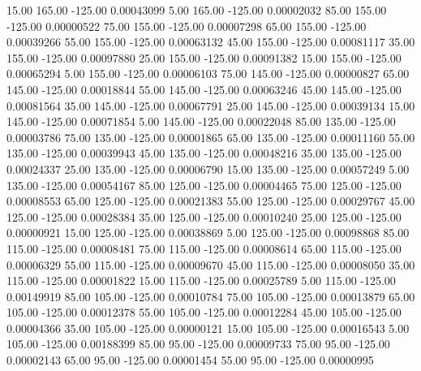      15.00    165.00   -125.00     0.00043099
      5.00    165.00   -125.00     0.00002032
     85.00    155.00   -125.00     0.00000522
     75.00    155.00   -125.00     0.00007298
     65.00    155.00   -125.00     0.00039266
     55.00    155.00   -125.00     0.00063132
     45.00    155.00   -125.00     0.00081117
     35.00    155.00   -125.00     0.00097880
     25.00    155.00   -125.00     0.00091382
     15.00    155.00   -125.00     0.00065294
      5.00    155.00   -125.00     0.00006103
     75.00    145.00   -125.00     0.00000827
     65.00    145.00   -125.00     0.00018844
     55.00    145.00   -125.00     0.00063246
     45.00    145.00   -125.00     0.00081564
     35.00    145.00   -125.00     0.00067791
     25.00    145.00   -125.00     0.00039134
     15.00    145.00   -125.00     0.00071854
      5.00    145.00   -125.00     0.00022048
     85.00    135.00   -125.00     0.00003786
     75.00    135.00   -125.00     0.00001865
     65.00    135.00   -125.00     0.00011160
     55.00    135.00   -125.00     0.00039943
     45.00    135.00   -125.00     0.00048216
     35.00    135.00   -125.00     0.00024337
     25.00    135.00   -125.00     0.00006790
     15.00    135.00   -125.00     0.00057249
      5.00    135.00   -125.00     0.00054167
     85.00    125.00   -125.00     0.00004465
     75.00    125.00   -125.00     0.00008553
     65.00    125.00   -125.00     0.00021383
     55.00    125.00   -125.00     0.00029767
     45.00    125.00   -125.00     0.00028384
     35.00    125.00   -125.00     0.00010240
     25.00    125.00   -125.00     0.00000921
     15.00    125.00   -125.00     0.00038869
      5.00    125.00   -125.00     0.00098868
     85.00    115.00   -125.00     0.00008481
     75.00    115.00   -125.00     0.00008614
     65.00    115.00   -125.00     0.00006329
     55.00    115.00   -125.00     0.00009670
     45.00    115.00   -125.00     0.00008050
     35.00    115.00   -125.00     0.00001822
     15.00    115.00   -125.00     0.00025789
      5.00    115.00   -125.00     0.00149919
     85.00    105.00   -125.00     0.00010784
     75.00    105.00   -125.00     0.00013879
     65.00    105.00   -125.00     0.00012378
     55.00    105.00   -125.00     0.00012284
     45.00    105.00   -125.00     0.00004366
     35.00    105.00   -125.00     0.00000121
     15.00    105.00   -125.00     0.00016543
      5.00    105.00   -125.00     0.00188399
     85.00     95.00   -125.00     0.00009733
     75.00     95.00   -125.00     0.00002143
     65.00     95.00   -125.00     0.00001454
     55.00     95.00   -125.00     0.00000995
